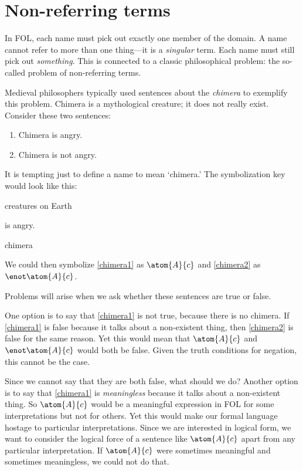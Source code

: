 \section{Non-referring terms}

In FOL, each name must pick out exactly one member of the domain. A name cannot refer to more than one thing---it is a \emph{singular} term. Each name must still pick out \emph{something}. This is connected to a classic philosophical problem: the so-called problem of non-referring terms.

Medieval philosophers typically used sentences about the \emph{chimera} to exemplify this problem. Chimera is a mythological creature; it does not really exist. Consider these two sentences:
\begin{enumerate}
\item\label{chimera1} Chimera is angry.
\item\label{chimera2} Chimera is not angry.
\end{enumerate}
It is tempting just to define a name to mean `chimera.' The symbolization key would look like this:
\begin{ekey}
\item[\text{domain}] creatures on Earth
\item[\atom{A}{x}]  is angry.
\item[c] chimera
\end{ekey}
We could then symbolize \cref*{chimera1} as $\atom{A}{c}$ and \cref*{chimera2} as $\enot \atom{A}{c}$.

Problems will arise when we ask whether these sentences are true or false.

One option is to say that \cref*{chimera1} is not true, because there is no chimera. If \cref*{chimera1} is false because it talks about a non-existent thing, then \cref*{chimera2} is false for the same reason. Yet this would mean that $\atom{A}{c}$ and $\enot \atom{A}{c}$ would both be false. Given the truth conditions for negation, this cannot be the case.

Since we cannot say that they are both false, what should we do? Another option is to say that \cref*{chimera1} is \emph{meaningless} because it talks about a non-existent thing. So $\atom{A}{c}$ would be a meaningful expression in FOL for some interpretations but not for others. Yet this would make our formal language hostage to particular interpretations. Since we are interested in logical form, we want to consider the logical force of a sentence like $\atom{A}{c}$ apart from any particular interpretation. If $\atom{A}{c}$ were sometimes meaningful and sometimes meaningless, we could not do that.

